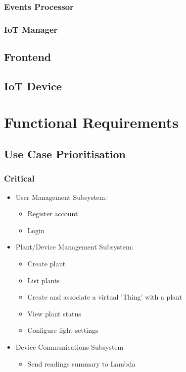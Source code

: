 \documentclass{article}
\begin{document}
		\subsubsection{Events Processor}
		
		\subsubsection{IoT Manager}
		
	\subsection{Frontend}
		
	
	\subsection{IoT Device}

\section{Functional Requirements}
	\subsection{Use Case Prioritisation}
		\subsubsection{Critical}
			\begin{itemize}
				\item User Management Subsystem:
				\begin{itemize}
					\item Register account
					\item Login
				\end{itemize}
				
				\item Plant/Device Management Subsystem:
				\begin{itemize}
					\item Create plant
					\item List plants
					\item Create and associate a virtual 'Thing' with a plant
					\item View plant status
					\item Configure light settings
				\end{itemize}
				
				\item Device Communications Subsystem
				\begin{itemize}
					\item Send readings summary to Lambda
				\end{itemize}
			\end{itemize}
		
\end{document}
